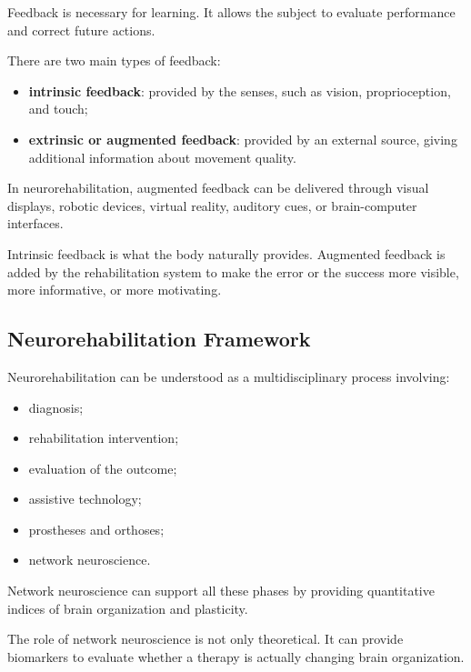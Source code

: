 Feedback is necessary for learning. It allows the subject to evaluate performance and correct future actions.

There are two main types of feedback:

\begin{itemize}[noitemsep]
    \item \textbf{intrinsic feedback}: provided by the senses, such as vision, proprioception, and touch;
    \item \textbf{extrinsic or augmented feedback}: provided by an external source, giving additional information about movement quality.
\end{itemize}

In neurorehabilitation, augmented feedback can be delivered through visual displays, robotic devices, virtual reality, auditory cues, or brain-computer interfaces.

\begin{authornote}
Intrinsic feedback is what the body naturally provides. Augmented feedback is added by the rehabilitation system to make the error or the success more visible, more informative, or more motivating.
\end{authornote}

\subsection{Neurorehabilitation Framework}

Neurorehabilitation can be understood as a multidisciplinary process involving:

\begin{itemize}[noitemsep]
    \item diagnosis;
    \item rehabilitation intervention;
    \item evaluation of the outcome;
    \item assistive technology;
    \item prostheses and orthoses;
    \item network neuroscience.
\end{itemize}

Network neuroscience can support all these phases by providing quantitative indices of brain organization and plasticity.

\begin{authornote}
The role of network neuroscience is not only theoretical. It can provide biomarkers to evaluate whether a therapy is actually changing brain organization.
\end{authornote}

